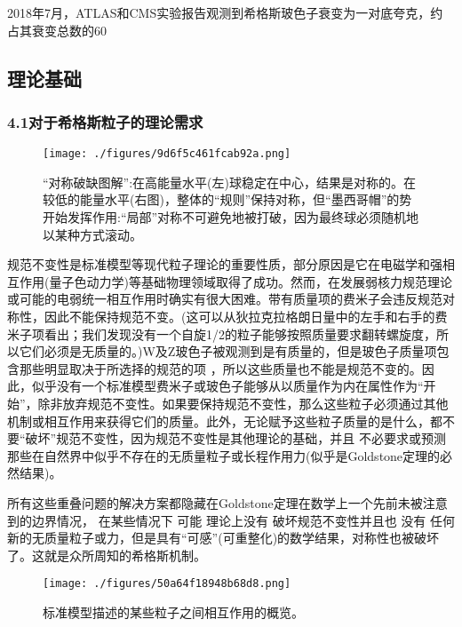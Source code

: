 2018年7月，ATLAS和CMS实验报告观测到希格斯玻色子衰变为一对底夸克，约占其衰变总数的60%

\subsection{理论基础}

\subsubsection{4.1对于希格斯粒子的理论需求}

\begin{figure}[ht]
\centering
\texttt{[image: ./figures/9d6f5c461fcab92a.png]}
\caption{“对称破缺图解”:在高能量水平(左)球稳定在中心，结果是对称的。在较低的能量水平(右图)，整体的“规则”保持对称，但“墨西哥帽”的势开始发挥作用:“局部”对称不可避免地被打破，因为最终球必须随机地以某种方式滚动。} \label{fig_Higgs_9}
\end{figure}

规范不变性是标准模型等现代粒子理论的重要性质，部分原因是它在电磁学和强相互作用(量子色动力学)等基础物理领域取得了成功。然而，在发展弱核力规范理论或可能的电弱统一相互作用时确实有很大困难。带有质量项的费米子会违反规范对称性，因此不能保持规范不变。(这可以从狄拉克拉格朗日量中的左手和右手的费米子项看出；我们发现没有一个自旋1/2的粒子能够按照质量要求翻转螺旋度，所以它们必须是无质量的。)W及Z玻色子被观测到是有质量的，但是玻色子质量项包含那些明显取决于所选择的规范的项 ，所以这些质量也不能是规范不变的。因此，似乎没有一个标准模型费米子或玻色子能够从以质量作为内在属性作为“开始”，除非放弃规范不变性。如果要保持规范不变性，那么这些粒子必须通过其他机制或相互作用来获得它们的质量。此外，无论赋予这些粒子质量的是什么，都不要“破坏”规范不变性，因为规范不变性是其他理论的基础，并且 不必要求或预测那些在自然界中似乎不存在的无质量粒子或长程作用力(似乎是Goldstone定理的必然结果)。

所有这些重叠问题的解决方案都隐藏在Goldstone定理在数学上一个先前未被注意到的边界情况， 在某些情况下 可能 理论上没有 破坏规范不变性并且也 没有 任何新的无质量粒子或力，但是具有“可感”(可重整化)的数学结果，对称性也被破坏了。这就是众所周知的希格斯机制。

\begin{figure}[ht]
\centering
\texttt{[image: ./figures/50a64f18948b68d8.png]}
\caption{标准模型描述的某些粒子之间相互作用的概览。} \label{fig_Higgs_10}
\end{figure}

